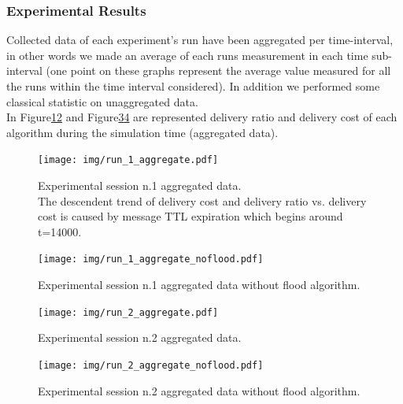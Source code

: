 \subsubsection{Experimental Results}
\label{exp_results_experimental}

Collected data of each experiment's run have been aggregated per time-interval, in other words we made an average of each runs measurement in each time sub-interval (one point on these graphs represent the average value measured for all the runs within the time interval considered). In addition we performed some classical statistic on unaggregated data.\\
In Figure\ref{fig:run_1_aggregate}\ref{fig:run_1_aggregate_noflood} and Figure\ref{fig:run_2_aggregate}\ref{fig:run_2_aggregate_noflood} are represented delivery ratio and delivery cost of each algorithm during the simulation time (aggregated data).\\
\newpage
\begin{center}
\begin{figure}[h!]
        \centering
    		\texttt{[image: img/run\_1\_aggregate.pdf]}
    		\caption{Experimental session n.1 aggregated data.\\ The descendent trend of delivery cost and delivery ratio vs. delivery cost is caused by message TTL expiration which begins around t=14000.}
    		\label{fig:run_1_aggregate}
\end{figure}
\begin{figure}[h!]
		\centering
    		\texttt{[image: img/run\_1\_aggregate\_noflood.pdf]}
    		\caption{Experimental session n.1 aggregated data without flood algorithm.}
    		\label{fig:run_1_aggregate_noflood}
\end{figure}
\end{center}
\newpage
\begin{figure}[h!]
	\begin{center}
    \texttt{[image: img/run\_2\_aggregate.pdf]}
    \caption{Experimental session n.2 aggregated data.}
    \label{fig:run_2_aggregate}
  \end{center}
\end{figure}

\begin{figure}[h!]
	\begin{center}
    \texttt{[image: img/run\_2\_aggregate\_noflood.pdf]}
    \caption{Experimental session n.2 aggregated data without flood algorithm.}
    \label{fig:run_2_aggregate_noflood}
  \end{center}
\end{figure}
\newpage

